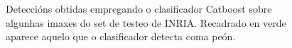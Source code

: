 \documentclass[galician]{./head/uvigo-tfg}
\begin{document}
\begin{figure}[h]
\begin{subfigure}{.3\textwidth}
          \label{fig:person8}
        \end{subfigure}
        \caption{Deteccións obtidas empregando o clasificador Catboost sobre algunhas imaxes do set de testeo de INRIA. Recadrado en verde aparece aquelo que o clasificador detecta coma peón.}
        \label{fig:detections}
    \end{figure}
\end{document}
